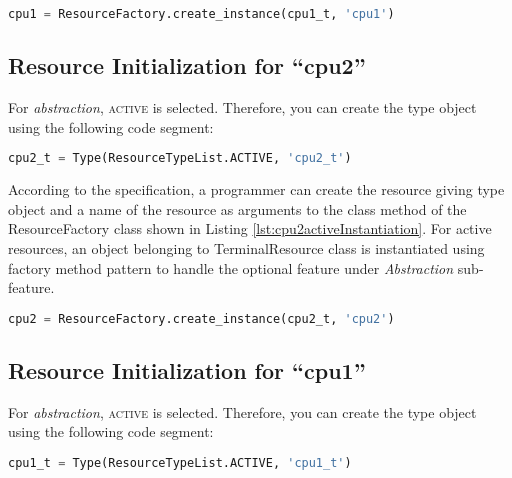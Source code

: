 \documentclass[]{scrartcl}
\begin{document}
\begin{lstlisting}[language=Python, frame=single, label={lst:cpu1activeInstantiation}, caption={Active resource instantiation using ResourceFactory class}]
cpu1 = ResourceFactory.create_instance(cpu1_t, 'cpu1')
\end{lstlisting}
        

\subsection{Resource Initialization for ``\textsf{cpu2}''}
        
For \emph{abstraction}, \textsc{active} is selected. Therefore, you can create the type object using the following code segment:

\begin{lstlisting}[language=Python, frame=single, label={lst:activeType}, caption={Active resource type object instantiation}]
cpu2_t = Type(ResourceTypeList.ACTIVE, 'cpu2_t')
\end{lstlisting}
        
        
According to the specification, a programmer can create the resource giving type object and a name of the resource as arguments to the class method of the
ResourceFactory class shown in Listing \ref{lst:cpu2activeInstantiation}. For active resources, an object belonging to \textsf{TerminalResource} class is instantiated
using factory method pattern to handle the optional feature under \emph{Abstraction} sub-feature.


\begin{lstlisting}[language=Python, frame=single, label={lst:cpu2activeInstantiation}, caption={Active resource instantiation using ResourceFactory class}]
cpu2 = ResourceFactory.create_instance(cpu2_t, 'cpu2')
\end{lstlisting}
        

\subsection{Resource Initialization for ``\textsf{cpu1}''}
        
For \emph{abstraction}, \textsc{active} is selected. Therefore, you can create the type object using the following code segment:

\begin{lstlisting}[language=Python, frame=single, label={lst:activeType}, caption={Active resource type object instantiation}]
cpu1_t = Type(ResourceTypeList.ACTIVE, 'cpu1_t')
\end{lstlisting}
        
\end{document}
